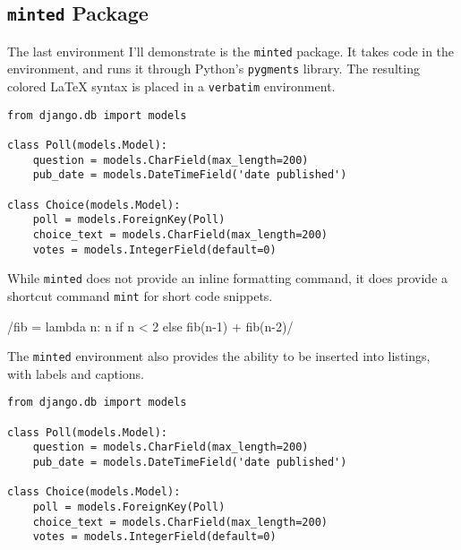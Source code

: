 
\subsection{\texttt{minted} Package}

The last environment I'll demonstrate is the \verb|minted| package. It takes code in the environment, and runs it through Python's \verb|pygments| library. The resulting colored \LaTeX{} syntax is placed in a \verb|verbatim| environment.

\begin{verbatim}
from django.db import models

class Poll(models.Model):
    question = models.CharField(max_length=200)
    pub_date = models.DateTimeField('date published')

class Choice(models.Model):
    poll = models.ForeignKey(Poll)
    choice_text = models.CharField(max_length=200)
    votes = models.IntegerField(default=0)
\end{verbatim}

While \verb|minted| does not provide an inline formatting command, it does provide a shortcut command \verb|mint| for short code snippets.

/fib = lambda n: n if n < 2 else fib(n-1) + fib(n-2)/

The \verb|minted| environment also provides the ability to be inserted into listings, with labels and captions.

\begin{listing}[H]
\begin{verbatim}
from django.db import models

class Poll(models.Model):
    question = models.CharField(max_length=200)
    pub_date = models.DateTimeField('date published')

class Choice(models.Model):
    poll = models.ForeignKey(Poll)
    choice_text = models.CharField(max_length=200)
    votes = models.IntegerField(default=0)
\end{verbatim}
\cprotect\caption[Minted Example]{\verb|models.py| from Django Tutorial using Minted}
\label{code:django:models_basic_minted}
\end{listing}